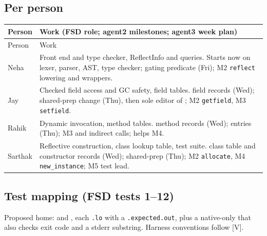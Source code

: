 \documentclass[10pt]{article}
\newcommand{\code}[1]{\texttt{\small #1}}
\newcommand{\mV}{\textsf{\scriptsize[V]}}
\begin{document}
\subsection{Per person}\label{sec:lo5-people}
\begin{xltabular}{\linewidth}{@{}L{1.5cm}Y@{}}
\toprule
Person & Work (FSD role; agent2 milestones; agent3 week plan) \\
\midrule
\endfirsthead
\toprule Person & Work \\ \midrule
\endhead
Neha & Front end and type checker, ReflectInfo and queries. Starts now on lexer, parser, AST, type checker; gating predicate (Fri); M2 \code{reflect} lowering and wrappers. \\
Jay & Checked field access and GC safety, field tables.  field records (Wed); shared-prep  change (Thu), then sole editor of ; M2 \code{getfield}, M3 \code{setfield}. \\
Rahik & Dynamic invocation, method tables.  method records (Wed);  entries (Thu); M3  and indirect calls; helps M4. \\
Sarthak & Reflective construction, class lookup table, test suite.  class table and constructor records (Wed); shared-prep  (Thu); M2 \code{allocate}, M4 \code{new\_instance}; M5 test lead. \\
\bottomrule
\end{xltabular}

\subsection{Test mapping (FSD tests 1--12)}\label{sec:lo5-tests}
Proposed home:  and , each \code{.lo} with a \code{.expected.out}, plus a native-only  that also checks exit code and a stderr substring. Harness conventions follow  \mV.
\end{document}
